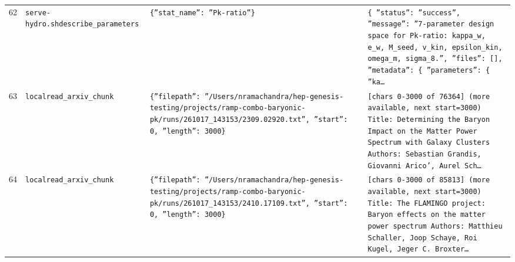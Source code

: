 \documentclass[11pt,a4paper]{article}
\begin{document}
\begin{longtable}{@{}p{}p{}p{}p{}@{}}
62 & \texttt{serve-hydro.sh}\newline\texttt{describe\_\allowbreak{}parameters} & \texttt{\{''stat\_\allowbreak{}name'':\allowbreak{} ''Pk-ratio''\}\allowbreak{}} & \texttt{\{   ''status'':\allowbreak{} ''success'',\allowbreak{}   ''message'':\allowbreak{} ''7-parameter design space for Pk-ratio:\allowbreak{} kappa\_\allowbreak{}w,\allowbreak{} e\_\allowbreak{}w,\allowbreak{} M\_\allowbreak{}seed,\allowbreak{} v\_\allowbreak{}kin,\allowbreak{} epsilon\_\allowbreak{}kin,\allowbreak{} omega\_\allowbreak{}m,\allowbreak{} sigma\_\allowbreak{}8.'',\allowbreak{}   ''files'':\allowbreak{} []\allowbreak{},\allowbreak{}   ''metadata'':\allowbreak{} \{     ''parameters'':\allowbreak{} \{       ''ka\ldots{}\allowbreak{}} \\
63 & \texttt{local}\newline\texttt{read\_\allowbreak{}arxiv\_\allowbreak{}chunk} & \texttt{\{''filepath'':\allowbreak{} ''/\allowbreak{}Users/\allowbreak{}nramachandra/\allowbreak{}hep-genesis-testing/\allowbreak{}projects/\allowbreak{}ramp-combo-baryonic-pk/\allowbreak{}runs/\allowbreak{}261017\_\allowbreak{}143153/\allowbreak{}2309.02920.txt'',\allowbreak{} ''start'':\allowbreak{} 0,\allowbreak{} ''length'':\allowbreak{} 3000\}\allowbreak{}} & \texttt{[chars 0-3000 of 76364]\allowbreak{} (more available,\allowbreak{} next start=\allowbreak{}3000)\allowbreak{}  Title:\allowbreak{} Determining the Baryon Impact on the Matter Power Spectrum with Galaxy Clusters Authors:\allowbreak{} Sebastian Grandis,\allowbreak{} Giovanni Arico',\allowbreak{} Aurel Sch\ldots{}\allowbreak{}} \\
64 & \texttt{local}\newline\texttt{read\_\allowbreak{}arxiv\_\allowbreak{}chunk} & \texttt{\{''filepath'':\allowbreak{} ''/\allowbreak{}Users/\allowbreak{}nramachandra/\allowbreak{}hep-genesis-testing/\allowbreak{}projects/\allowbreak{}ramp-combo-baryonic-pk/\allowbreak{}runs/\allowbreak{}261017\_\allowbreak{}143153/\allowbreak{}2410.17109.txt'',\allowbreak{} ''start'':\allowbreak{} 0,\allowbreak{} ''length'':\allowbreak{} 3000\}\allowbreak{}} & \texttt{[chars 0-3000 of 85813]\allowbreak{} (more available,\allowbreak{} next start=\allowbreak{}3000)\allowbreak{}  Title:\allowbreak{} The FLAMINGO project:\allowbreak{} Baryon effects on the matter power spectrum Authors:\allowbreak{} Matthieu Schaller,\allowbreak{} Joop Schaye,\allowbreak{} Roi Kugel,\allowbreak{} Jeger C. Broxter\ldots{}\allowbreak{}} \\

\end{longtable}
\end{document}
